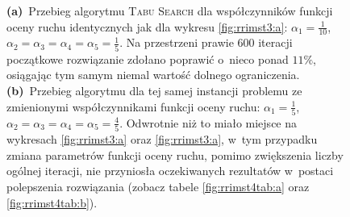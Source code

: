 \begin{figure}[!h]
{		 \textbf{(a)}~Przebieg algorytmu \textsc{Tabu Search} dla współczynników funkcji oceny ruchu identycznych jak dla wykresu \ref{fig:rrimst3:a}: $\alpha_{1} = \frac{1}{10}$, $\alpha_{2} = \alpha_{3} = \alpha_{4} = \alpha_{5} = \frac{1}{5}$. Na przestrzeni prawie $600$ iteracji początkowe rozwiązanie zdołano poprawić o~nieco ponad $11\%$, osiągając tym samym niemal wartość dolnego ograniczenia.
		 \textbf{(b)}~Przebieg algorytmu dla tej samej instancji problemu ze zmienionymi współczynnikami funkcji oceny ruchu: $\alpha_{1} = \frac{1}{5}$, $\alpha_{2} = \alpha_{3} = \alpha_{4} = \alpha_{5} = \frac{4}{5}$. Odwrotnie niż to miało miejsce na wykresach \ref{fig:rrimst3:a} oraz \ref{fig:rrimst3:a}, w~tym przypadku zmiana parametrów funkcji oceny ruchu, pomimo zwiększenia liczby ogólnej iteracji, nie przyniosła oczekiwanych rezultatów w~postaci polepszenia rozwiązania (zobacz tabele \ref{fig:rrimst4tab:a} oraz \ref{fig:rrimst4tab:b}).
	}
	\label{fig:rrimst4}
\end{figure}

